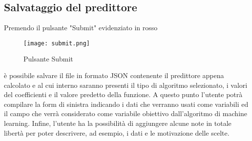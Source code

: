\documentclass[../manuale-utente.tex]{subfiles}
\begin{document}
\newpage
  
\subsection{Salvataggio del predittore}
\label{subs:salvataggio-del-predittore}
Premendo il pulsante "Submit" evidenziato in rosso

\begin{figure}[h!]
  \begin{center}
    \texttt{[image: submit.png]}\\
    \caption{Pulsante Submit}%
    \label{fig:pulsante-submit}
  \end{center}
\end{figure}

è possibile salvare il file in formato JSON contenente il predittore appena calcolato e al cui interno saranno presenti il tipo di algoritmo selezionato, i valori del coefficienti e il valore predetto della funzione.
A questo punto l'utente potrà compilare la form di sinistra indicando i dati che verranno usati come variabili ed il campo che verrà considerato come variabile obiettivo dall'algoritmo di machine learning. Infine, l'utente ha la possibilità di aggiungere alcune note in totale libertà per poter descrivere, ad esempio, i dati e le motivazione delle scelte.
\end{document}
